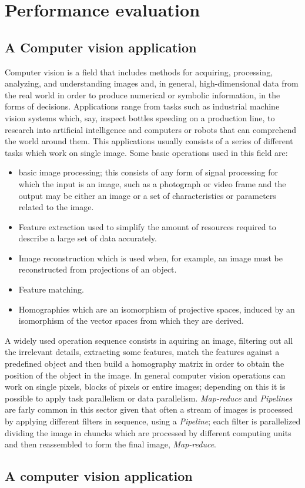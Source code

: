 \documentclass[a4paper,11pt,oneside]{book}
\begin{document}
\chapter{Performance evaluation}
\section{A Computer vision application}
Computer vision is a field that includes methods for acquiring, processing, analyzing, and understanding images and, in general, high-dimensional data from the real world in order to produce numerical or symbolic information, in the forms of decisions. Applications range from tasks such as industrial machine vision systems which, say, inspect bottles speeding on a production line, to research into artificial intelligence and computers or robots that can comprehend the world around them. This applications usually consists of a series of different tasks which work on single image. Some basic operations used in this field are:
\begin{itemize}
\item{basic image processing; this consists of any form of signal processing for which the input is an image, such as a photograph or video frame and the output may be either an image or a set of characteristics or parameters related to the image.}
\item{Feature extraction used to simplify the amount of resources required to describe a large set of data accurately.}
\item{Image reconstruction which is used when, for example, an image must be reconstructed from projections of an object.}
\item{Feature matching.}
\item{Homographies which are an isomorphism of projective spaces, induced by an isomorphism of the vector spaces from which they are derived.}
\end{itemize}

A widely used operation sequence consists in aquiring an image, filtering out all the irrelevant details, extracting some features, match the features against a predefined object and then build a homography matrix in order to obtain the position of the object in the image. In general computer vision operations can work on single pixels, blocks of pixels or entire images; depending on this it is possible to apply task parallelism or data parallelism. \emph{Map-reduce} and \emph{Pipelines} are farly common in this sector given that often a stream of images is processed by applying different filters in sequence, using a \emph{Pipeline}; each filter is parallelized dividing the image in chuncks which are processed by different computing units and then reassembled to form the final image, \emph{Map-reduce}.\section{A computer vision application}
\end{document}
